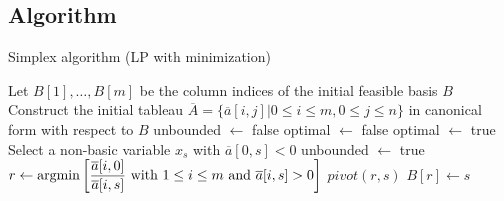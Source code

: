 \subsection{Algorithm}
\begin{algorithm}[H]
    \caption{Simplex algorithm (LP with minimization)}
        \begin{algorithmic}[1]
            \State Let $B[1],\dots,B[m]$ be the column indices of the initial feasible basis $B$
            \State Construct the initial tableau $\overline{A}=\{\overline{a}[i,j]|0 \leq i \leq m, 0 \leq j \leq n\}$ in canonical form with respect to $B$
            \State unbounded $\leftarrow$ false
            \State optimal $\leftarrow$ false
                    \State optimal $\leftarrow$ true
                \Else
                    \State Select a non-basic variable $x_s$ with $\overline{a}[0,s] < 0$
                        \State unbounded $\leftarrow$ true
                    \Else 
                        \State $r \leftarrow \textnormal{argmin}\left[ \dfrac{\overline{a}[i,0]}{\overline{a}[i,s]} \textnormal{ with } 1 \leq i \leq m \textnormal{ and } \overline{a}[i,s]>0\right]$
                        \State $pivot(r,s)$
                        \State $B[r] \leftarrow s$
                    \EndIf
                \EndIf
            \EndWhile
        \end{algorithmic}
\end{algorithm}

